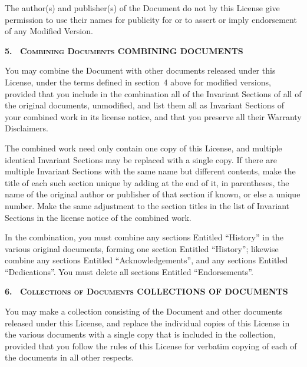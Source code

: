 The author(s) and publisher(s) of the Document do not by
this License give permission to use their names for
publicity for or to assert or imply endorsement of any
Modified Version.

\medskip
\begin{center}
  \textbf{%
    \Large
    5.\
    \ifgfdl@sc
      \textsc{Combining Documents}%
    \else
      COMBINING DOCUMENTS%
    \fi
  }
\end{center}

\noindent
You may combine the Document with other documents released
under this License, under the terms defined in section~4
above for modified versions, provided that you include in
the combination all of the Invariant Sections of all of
the original documents, unmodified, and list them all as
Invariant Sections of your combined work in its license
notice, and that you preserve all their Warranty
Disclaimers.

The combined work need only contain one copy of this
License, and multiple identical Invariant Sections may be
replaced with a single copy. If there are multiple Invariant
Sections with the same name but different contents, make the
title of each such section unique by adding at the end of
it, in parentheses, the name of the original author or
publisher of that section if known, or else a unique number.
Make the same adjustment to the section titles in the list
of Invariant Sections in the license notice of the combined
work.

In the combination, you must combine any sections Entitled
\enquote{History} in the various original documents, forming
one section Entitled \enquote{History}; likewise combine any
sections Entitled \enquote{Acknowledgements}, and any
sections Entitled \enquote{Dedications}. You must delete all
sections Entitled \enquote{Endorsements}.

\medskip
\begin{center}
  \textbf{%
    \Large
    6.\
    \ifgfdl@sc
      \textsc{Collections of Documents}%
    \else
      COLLECTIONS OF DOCUMENTS%
    \fi
  }%
\end{center}

\noindent
You may make a collection consisting of the Document and
other documents released under this License, and replace the
individual copies of this License in the various documents
with a single copy that is included in the collection,
provided that you follow the rules of this License for
verbatim copying of each of the documents in all other
respects.

